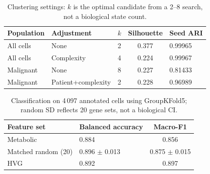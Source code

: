 \begin{table}[htbp]
\centering
\small
\caption{Clustering settings: $k$ is the optimal candidate from a 2--8 search, not a biological state count.}
\label{tab:clustering}
\begin{tabular}{llcc}
\toprule
Population & Adjustment & $k$ & Silhouette & Seed ARI \\
\midrule
All cells & None & 2 & 0.377 & 0.99965 \\
All cells & Complexity & 4 & 0.224 & 0.99967 \\
Malignant & None & 8 & 0.227 & 0.81433 \\
Malignant & Patient+complexity & 2 & 0.228 & 0.96989 \\
\bottomrule
\end{tabular}
\end{table}

\begin{table}[htbp]
\centering
\small
\caption{Classification on 4\,097 annotated cells using GroupKFold5; random SD reflects 20 gene sets, not a biological CI.}
\label{tab:classification}
\begin{tabular}{llc}
\toprule
Feature set & Balanced accuracy & Macro-F1 \\
\midrule
Metabolic & 0.884 & 0.856 \\
Matched random (20) & 0.896 $\pm$ 0.013 & 0.875 $\pm$ 0.015 \\
HVG & 0.892 & 0.897 \\
\bottomrule
\end{tabular}
\end{table}
